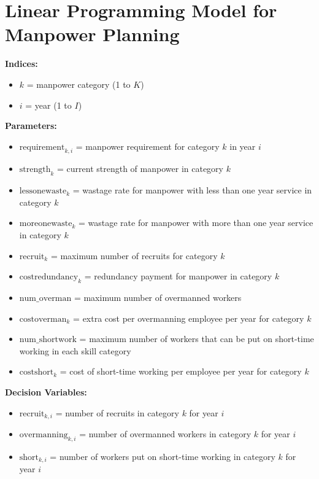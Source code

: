\documentclass{article}
\begin{document}
\section*{Linear Programming Model for Manpower Planning}

\textbf{Indices:}
\begin{itemize}
    \item \( k \) = manpower category (1 to \( K \))
    \item \( i \) = year (1 to \( I \))
\end{itemize}

\textbf{Parameters:}
\begin{itemize}
    \item \( \text{requirement}_{k,i} \) = manpower requirement for category \( k \) in year \( i \)
    \item \( \text{strength}_{k} \) = current strength of manpower in category \( k \)
    \item \( \text{lessonewaste}_{k} \) = wastage rate for manpower with less than one year service in category \( k \)
    \item \( \text{moreonewaste}_{k} \) = wastage rate for manpower with more than one year service in category \( k \)
    \item \( \text{recruit}_{k} \) = maximum number of recruits for category \( k \)
    \item \( \text{costredundancy}_{k} \) = redundancy payment for manpower in category \( k \)
    \item \( \text{num\_overman} \) = maximum number of overmanned workers
    \item \( \text{costoverman}_{k} \) = extra cost per overmanning employee per year for category \( k \)
    \item \( \text{num\_shortwork} \) = maximum number of workers that can be put on short-time working in each skill category
    \item \( \text{costshort}_{k} \) = cost of short-time working per employee per year for category \( k \)
\end{itemize}

\textbf{Decision Variables:}
\begin{itemize}
    \item \( \text{recruit}_{k,i} \) = number of recruits in category \( k \) for year \( i \)
    \item \( \text{overmanning}_{k,i} \) = number of overmanned workers in category \( k \) for year \( i \)
    \item \( \text{short}_{k,i} \) = number of workers put on short-time working in category \( k \) for year \( i \)
\end{itemize}
\end{document}
